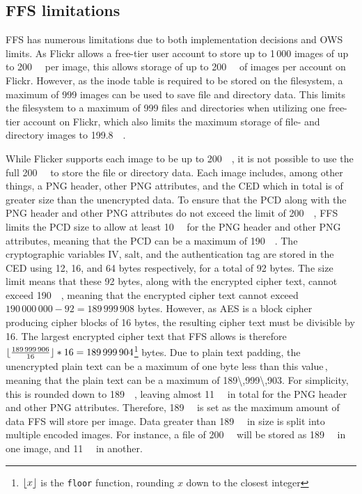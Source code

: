 \subsection{FFS limitations}
\label{subsec:ffs_limits}
\gls{FFS} has numerous limitations due to both implementation decisions and \gls{OWS} limits. As Flickr allows a \mbox{free-tier} user account to store up to 1\,000 images of up to \SI{200}{\mega\byte} per image, this allows storage of up to \SI{200}{\giga\byte} of images per account on Flickr. However, as the inode table is required to be stored on the filesystem, a maximum of 999 images can be used to save file and directory data. This limits the filesystem to a maximum of 999 files and directories when utilizing one \mbox{free-tier} account on Flickr, which also limits the maximum storage of file- and directory images to \SI{199.8}{\giga\byte}.

While Flicker supports each image to be up to \SI{200}{\mega\byte}, it is not possible to use the full \SI{200}{\mega\byte} to store the file or directory data. Each image includes, among other things, a PNG header, other PNG attributes, and the \gls{CED} which in total is of greater size than the unencrypted data. To ensure that the \gls{PCD} along with the PNG header and other PNG attributes do not exceed the limit of \SI{200}{\mega\byte}, \gls{FFS} limits the \gls{PCD} size to allow at least \SI{10}{\mega\byte} for the PNG header and other PNG attributes, meaning that the \gls{PCD} can be a maximum of \SI{190}{\mega\byte}. The cryptographic variables \gls{IV}, salt, and the authentication tag are stored in the \gls{CED} using 12, 16, and 64 bytes respectively, for a total of 92 bytes. The size limit means that these 92 bytes, along with the encrypted cipher text, cannot exceed \SI{190}{\mega\byte}, meaning that the encrypted cipher text cannot exceed $190\,000\,000 - 92 = 189\,999\,908$ bytes. However, as \gls{AES} is a block cipher producing cipher blocks of 16 bytes, the resulting cipher text must be divisible by 16. The largest encrypted cipher text that \gls{FFS} allows is therefore $\lfloor \frac{189\,999\,906}{16} \rfloor*16 = 189\,999\,904$\footnote{$\lfloor x \rfloor$ is the \texttt{floor} function, rounding $x$ down to the closest integer} bytes. Due to plain text padding, the unencrypted plain text can be a maximum of one byte less than this value\,\cite{z.z.coderAnswerSizeData2010}, meaning that the plain text can be a maximum of \SI{189\,999\,903}{\byte}. For simplicity, this is rounded down to \SI{189}{\mega\byte}, leaving almost \SI{11}{\mega\byte} in total for the PNG header and other PNG attributes. Therefore, \SI{189}{\mega\byte} is set as the maximum amount of data \gls{FFS} will store per image. Data greater than \SI{189}{\mega\byte} in size is split into multiple encoded images. For instance, a file of \SI{200}{\mega\byte} will be stored as \SI{189}{\mega\byte} in one image, and \SI{11}{\mega\byte} in another. 

